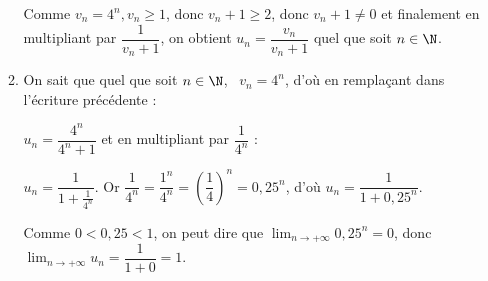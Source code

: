 \begin{enumerate}
\begin{enumerate}
Comme $v_n = 4^n, v_n \geqslant 1$, donc $v_n + 1 \geqslant 2$, donc $v_n + 1 \ne 0$ et finalement en multipliant par $\dfrac{1}{v_n + 1}$, on obtient $u_n = \dfrac{v_n}{v_n + 1}$ quel que soit $n \in \N$.
		\item %
		
On sait que quel que soit $n \in \N$, \, $v_n = 4^n$, d'où en remplaçant dans l'écriture précédente :

$u_n = \dfrac{4^n}{4^n +1}$ et en multipliant par $\dfrac{1}{4^n}$ :

$u_n = \dfrac{1}{1 + \frac{1}{4^n}}$. Or $\dfrac{1}{4^n} = \dfrac{1^n}{4^n} = \left(\dfrac{1}{4}\right)^n = 0,25^n$, d'où $u_n = \dfrac{1}{1 + 0,25^n}$.


Comme $0 < 0,25 < 1$, on peut dire que $\displaystyle\lim_{n \to + \infty} 0,25^n = 0$, donc $\displaystyle\lim_{n \to + \infty}  u_n = \dfrac{1}{1+0} = 1$.
	\end{enumerate}
\end{enumerate}


